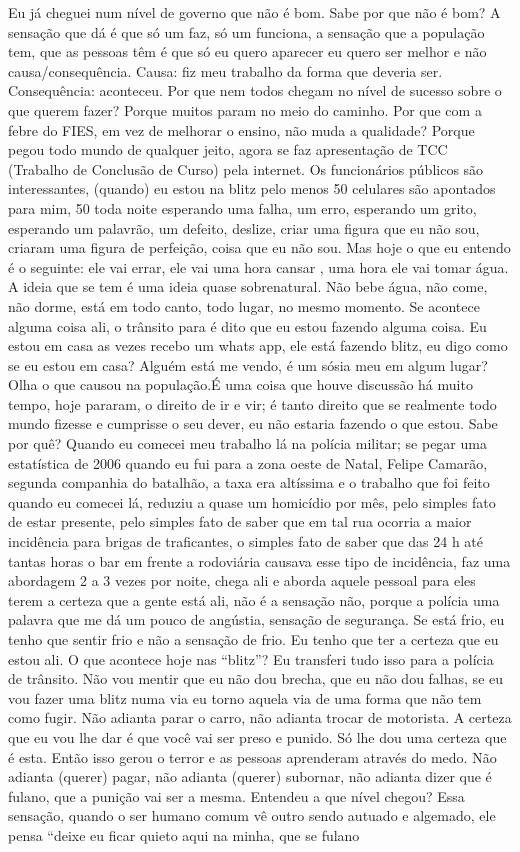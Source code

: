 \documentclass[
	12pt,				%
	openright,			%
	twoside,			%
	a4paper,			%
	chapter=TITLE,		%
	section=TITLE,		%
	subsection=TITLE,	%
	subsubsection=TITLE,%
	spanish,            %
	english,			%
	brazil				%
	]{abntex2}
\begin{document}
\begin{anexosenv}
	Eu já cheguei num nível de governo que não é bom. Sabe por que não é bom? A sensação que dá é que só um faz, só um funciona, a sensação que a população tem, que as pessoas têm é que só eu quero aparecer eu quero ser melhor e não causa/consequência. Causa: fiz meu trabalho da forma que deveria ser. Consequência: aconteceu.	Por que nem todos chegam no nível de sucesso sobre o que querem fazer? Porque muitos param no meio do caminho. Por que com a febre do FIES, em vez de melhorar o ensino, não muda a qualidade? Porque pegou todo mundo de qualquer jeito, agora se faz apresentação de TCC (Trabalho de Conclusão de Curso) pela internet. Os funcionários públicos são interessantes, (quando) eu estou na blitz pelo menos 50 celulares são apontados para mim, 50 toda noite esperando uma falha, um erro, esperando um grito, esperando um palavrão, um defeito, deslize, criar uma figura que eu não sou, criaram uma figura de perfeição, coisa que eu não sou. Mas hoje o que eu entendo é o seguinte: ele vai errar, ele vai uma hora cansar , uma hora ele vai tomar água. A ideia que se tem é uma ideia quase sobrenatural. Não bebe água, não come, não dorme, está em todo canto, todo lugar, no mesmo momento. Se acontece alguma coisa ali, o trânsito para é dito que eu estou fazendo alguma coisa. Eu estou em casa as vezes recebo um whats app, ele está fazendo blitz, eu digo como se eu estou em casa? Alguém está me vendo, é um sósia meu em algum lugar? Olha o que causou na população.É uma coisa que houve discussão há muito tempo, hoje pararam, o direito de ir e vir; é tanto direito que se realmente todo mundo fizesse e cumprisse o seu dever, eu não estaria fazendo o que estou. Sabe por quê? Quando eu comecei meu trabalho lá na polícia militar; se pegar uma estatística de 2006 quando eu fui para a zona oeste de Natal, Felipe Camarão, segunda companhia do batalhão, a taxa era altíssima e o trabalho que foi feito quando eu comecei lá, reduziu a quase um homicídio por mês, pelo simples fato de estar presente, pelo simples fato de saber que em tal rua ocorria a maior incidência para brigas de traficantes, o simples fato de saber que das 24 h até tantas horas o bar em frente a rodoviária causava esse tipo de incidência, faz uma abordagem 2 a 3 vezes por noite, chega ali e aborda aquele pessoal para eles terem a certeza que a gente está ali, não é a sensação não, porque a polícia uma palavra que me dá um pouco de angústia, sensação de segurança. Se está frio, eu tenho que sentir frio e não a sensação de frio. Eu tenho que ter a certeza que eu estou ali. O que acontece hoje nas “blitz”? Eu transferi tudo isso para a polícia de trânsito. Não vou mentir que eu não dou brecha, que eu não dou falhas, se eu vou fazer uma blitz numa via eu torno aquela via de uma forma que não tem como fugir. Não adianta parar o carro, não adianta trocar de motorista. A certeza que eu vou lhe dar é que você vai ser preso e punido. Só lhe dou uma certeza que é esta. Então isso gerou o terror e as pessoas aprenderam através do medo. Não adianta (querer) pagar, não adianta (querer) subornar, não adianta dizer que é fulano, que a punição vai ser a mesma. Entendeu a que nível chegou? Essa sensação, quando o ser humano comum vê outro sendo autuado e algemado, ele pensa “deixe eu ficar quieto aqui na minha, que se fulano 
\end{anexosenv}
\end{document}
